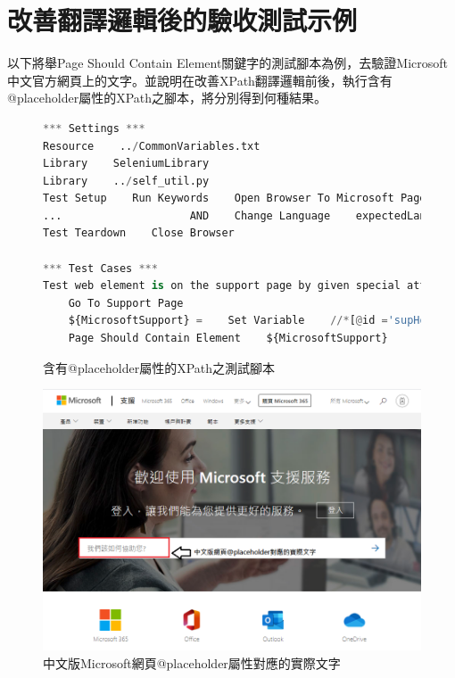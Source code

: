 \section{改善翻譯邏輯後的驗收測試示例}
以下將舉Page Should Contain Element關鍵字的測試腳本為例，去驗證Microsoft中文官方網頁上的文字。並說明在改善XPath翻譯邏輯前後，執行含有@placeholder屬性的XPath之腳本，將分別得到何種結果。

\begin{figure}[H]
\begin{lstlisting}[language={python}]
*** Settings ***
Resource    ../CommonVariables.txt
Library    SeleniumLibrary
Library    ../self_util.py
Test Setup    Run Keywords    Open Browser To Microsoft Page
...                    AND    Change Language    expectedLanguage=${language}
Test Teardown    Close Browser

*** Test Cases ***
Test web element is on the support page by given special attributes
    Go To Support Page
    ${MicrosoftSupport} =    Set Variable    //*[@id ='supHomeAndLandingPageSearchBox' and @placeholder ='How can we help you?']
    Page Should Contain Element    ${MicrosoftSupport}
\end{lstlisting}
\caption{含有@placeholder屬性的XPath之測試腳本}
\end{figure}

\begin{figure}[H]
\centering
\includegraphics[width= .9\textwidth]{../論文截圖/4-2-2 畫面上@placeholder的實際文字.png}
\caption{中文版Microsoft網頁@placeholder屬性對應的實際文字\cite{microsoft}}
\end{figure}

